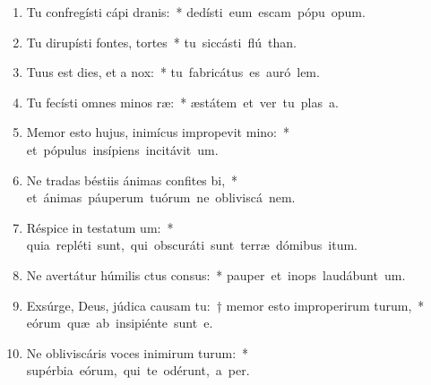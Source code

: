 \begin{flushleft}
\begin{enumerate}[leftmargin=*]
\item Tu confregísti cápi dranis:~* \mbox{dedísti eum escam pópu opum.}
\item Tu dirupísti fontes,  tortes~* \mbox{tu siccásti flú than.}
\item Tuus est dies, et a  nox:~* \mbox{tu fabricátus es auró  lem.}
\item Tu fecísti omnes minos ræ:~* \mbox{æstátem et ver tu plas a.}
\item Memor esto hujus, inimícus impropevit mino:~* \mbox{et pópulus insípiens incitávit  um.}
\item Ne tradas béstiis ánimas confites bi,~* \mbox{et ánimas páuperum tuórum ne obliviscá  nem.}
\item Réspice in testatum um:~* \mbox{quia repléti sunt, qui obscuráti sunt terræ dómibus itum.}
\item Ne avertátur húmilis ctus consus:~* \mbox{pauper et inops laudábunt  um.}
\item Exsúrge, Deus, júdica causam tu:~† memor esto improperirum turum,~* \mbox{eórum quæ ab insipiénte sunt  e.}
\item Ne obliviscáris voces inimirum turum:~* \mbox{supérbia eórum, qui te odérunt, a per.}


\end{enumerate}
\end{flushleft}


